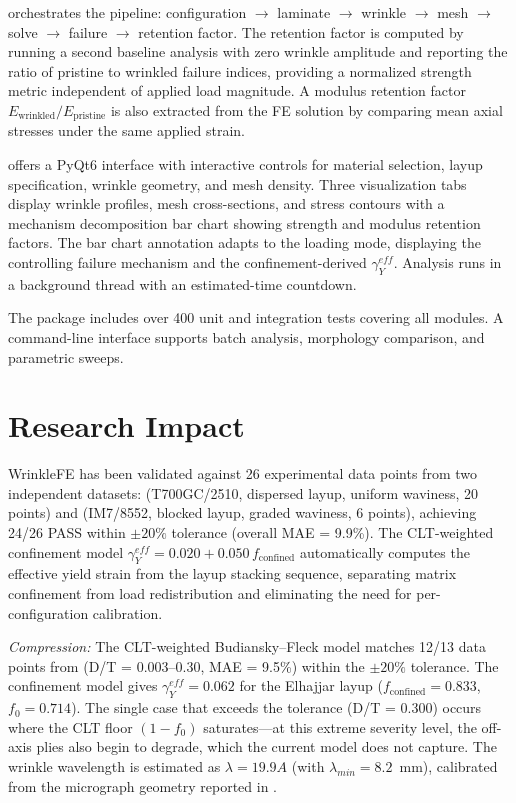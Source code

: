 \documentclass[10pt,a4paper]{article}
\begin{document}
\begin{description}[leftmargin=1.5em,labelindent=0em]
\item[Analysis] orchestrates the pipeline: configuration $\to$ laminate $\to$ wrinkle $\to$ mesh $\to$ solve $\to$ failure $\to$ retention factor.
The retention factor is computed by running a second baseline analysis with zero wrinkle amplitude and reporting the ratio of pristine to wrinkled failure indices, providing a normalized strength metric independent of applied load magnitude.
A modulus retention factor $E_{\text{wrinkled}}/E_{\text{pristine}}$ is also extracted from the FE solution by comparing mean axial stresses under the same applied strain.

\item[GUI] offers a PyQt6 interface with interactive controls for material selection, layup specification, wrinkle geometry, and mesh density.
Three visualization tabs display wrinkle profiles, mesh cross-sections, and stress contours with a mechanism decomposition bar chart showing strength and modulus retention factors.
The bar chart annotation adapts to the loading mode, displaying the controlling failure mechanism and the confinement-derived $\gamma_Y^{eff}$.
Analysis runs in a background thread with an estimated-time countdown.
\end{description}

The package includes over 400 unit and integration tests covering all modules.
A command-line interface supports batch analysis, morphology comparison, and parametric sweeps.

\section*{Research Impact}

WrinkleFE has been validated against 26 experimental data points from two independent datasets: \citet{Elhajjar2025} (T700GC/2510, dispersed layup, uniform waviness, 20 points) and \citet{Mukhopadhyay2015} (IM7/8552, blocked layup, graded waviness, 6 points), achieving 24/26 PASS within $\pm 20\%$ tolerance (overall MAE = 9.9\%).
The CLT-weighted confinement model $\gamma_Y^{eff} = 0.020 + 0.050\,f_{\text{confined}}$ automatically computes the effective yield strain from the layup stacking sequence, separating matrix confinement from load redistribution and eliminating the need for per-configuration calibration.

\textit{Compression:} The CLT-weighted Budiansky--Fleck model matches 12/13 data points from \citet{Elhajjar2025} (D/T = 0.003--0.30, MAE = 9.5\%) within the $\pm 20\%$ tolerance.
The confinement model gives $\gamma_Y^{eff} = 0.062$ for the Elhajjar layup ($f_{\text{confined}} = 0.833$, $f_0 = 0.714$).
The single case that exceeds the tolerance (D/T = 0.300) occurs where the CLT floor $(1-f_0)$ saturates---at this extreme severity level, the off-axis plies also begin to degrade, which the current model does not capture.
The wrinkle wavelength is estimated as $\lambda = 19.9 A$ (with $\lambda_{min} = 8.2$~mm), calibrated from the micrograph geometry reported in \citet{Elhajjar2014}.
\end{document}

